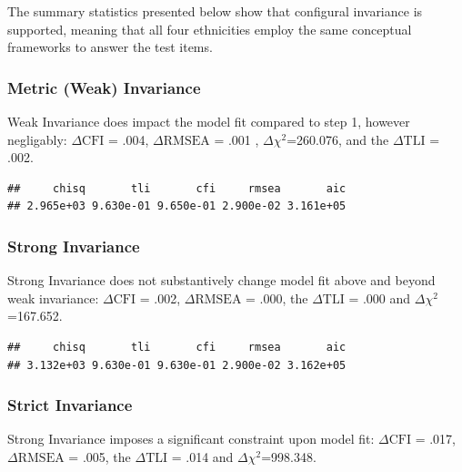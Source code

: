 \documentclass{article}\usepackage[]{graphicx}\usepackage[]{color}
\makeatletter
\newenvironment{kframe}{%
 \def\at@end@of@kframe{}%
 \ifinner\ifhmode%
  \def\at@end@of@kframe{\end{minipage}}%
  \begin{minipage}{\columnwidth}%
 \fi\fi%
 \def\FrameCommand##1{\hskip\@totalleftmargin \hskip-\fboxsep
 \colorbox{shadecolor}{##1}\hskip-\fboxsep
     \hskip-\linewidth \hskip-\@totalleftmargin \hskip\columnwidth}%
 \MakeFramed {\advance\hsize-\width
   \@totalleftmargin\z@ \linewidth\hsize
   \@setminipage}}%
 {\par\unskip\endMakeFramed%
 \at@end@of@kframe}
\newenvironment{knitrout}{}{} %
\makeatother
\begin{document}
The summary statistics presented below show that configural invariance is supported, meaning that all four ethnicities employ the same conceptual frameworks to answer the test items. 

\subsubsection{Metric (Weak) Invariance}
Weak Invariance does impact the model fit compared to step 1, however negligably: $\Delta\mathrm{CFI}$ = .004, $\Delta\mathrm{RMSEA}$ = .001 , $\Delta$$\chi^2$=260.076, and the $\Delta\mathrm{TLI}$ = .002.

\begin{knitrout}
\color{fgcolor}\begin{kframe}
\begin{verbatim}
##     chisq       tli       cfi     rmsea       aic 
## 2.965e+03 9.630e-01 9.650e-01 2.900e-02 3.161e+05
\end{verbatim}
\end{kframe}
\end{knitrout}


\subsubsection{Strong Invariance}
Strong Invariance does not substantively change model fit above and beyond weak invariance: $\Delta\mathrm{CFI}$ = .002, $\Delta\mathrm{RMSEA}$ = .000, the $\Delta\mathrm{TLI}$ = .000 and $\Delta$$\chi^2$=167.652. 

\begin{knitrout}
\color{fgcolor}\begin{kframe}
\begin{verbatim}
##     chisq       tli       cfi     rmsea       aic 
## 3.132e+03 9.630e-01 9.630e-01 2.900e-02 3.162e+05
\end{verbatim}
\end{kframe}
\end{knitrout}


\subsubsection{Strict Invariance}
Strong Invariance imposes a significant constraint upon model fit: $\Delta\mathrm{CFI}$ = .017, $\Delta\mathrm{RMSEA}$ = .005, the $\Delta\mathrm{TLI}$ = .014 and $\Delta$$\chi^2$=998.348. 
\end{document}
